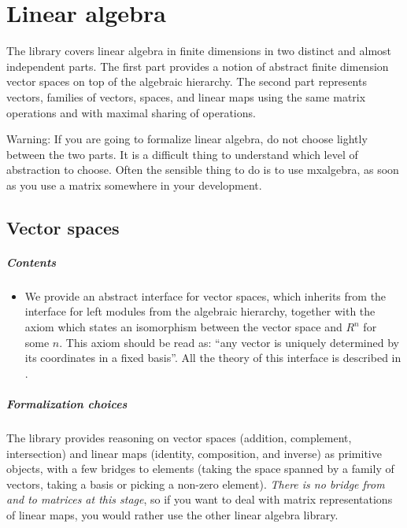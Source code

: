 \chapter{Linear algebra}
\label{linalg:smith}

The library covers linear algebra in finite dimensions in two distinct
and almost independent parts. The first part provides a notion of
abstract finite dimension vector spaces on top of the algebraic
hierarchy. The second part represents vectors, families of vectors,
spaces, and linear maps using the same matrix operations and with
maximal sharing of operations.

Warning: If you are going to formalize linear algebra, do not choose
lightly between the two parts. It is a difficult thing to understand
which level of abstraction to choose. Often the sensible thing to do
is to use mxalgebra, as soon as you use a matrix somewhere in your
development.

\section{Vector spaces}
\label{sec:vector-spaces}

\paragraph{Contents}

\begin{itemize}
\item We provide an abstract interface for vector spaces, which
  inherits from the interface for left modules from the algebraic
  hierarchy, together with the axiom  which states
  an isomorphism between the vector space and $R^n$ for some $n$. This
  axiom should be read as: ``any vector is uniquely determined by its
  coordinates in a fixed basis''. All the theory of this interface is
  described in .
\end{itemize}

\paragraph{Formalization choices}

The library provides reasoning on vector spaces (addition, complement,
intersection) and linear maps (identity, composition, and inverse) as
primitive objects, with a few bridges to elements (taking the space
spanned by a family of vectors, taking a basis or picking a non-zero
element). \emph{There is no bridge from and to matrices at this
  stage}, so if you want to deal with matrix representations of linear
maps, you would rather use the other linear algebra library.

